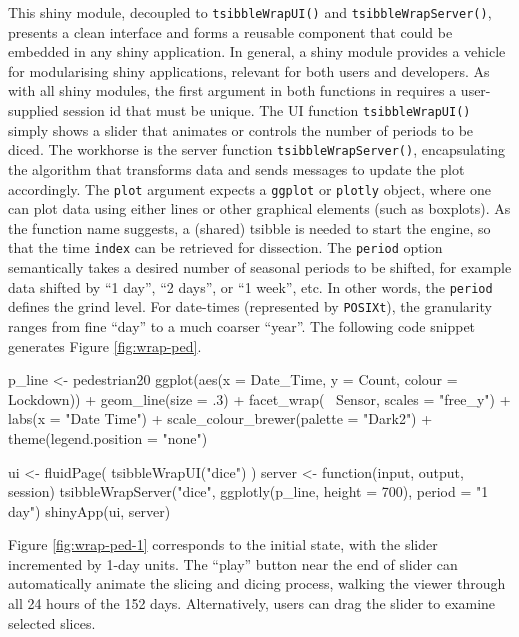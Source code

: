 This shiny module, decoupled to \texttt{tsibbleWrapUI()} and
\texttt{tsibbleWrapServer()}, presents a clean interface and forms a
reusable component that could be embedded in any shiny application. In
general, a shiny module provides a vehicle for modularising shiny
applications, relevant for both users and developers. As with all shiny
modules, the first argument in both functions in 
requires a user-supplied session id that must be unique. The UI function
\texttt{tsibbleWrapUI()} simply shows a slider that animates or controls
the number of periods to be diced. The workhorse is the server function
\texttt{tsibbleWrapServer()}, encapsulating the algorithm that
transforms data and sends messages to update the plot accordingly. The
\texttt{plot} argument expects a \texttt{ggplot} or \texttt{plotly}
object, where one can plot data using either lines or other graphical
elements (such as boxplots). As the function name suggests, a (shared)
tsibble is needed to start the engine, so that the time \texttt{index}
can be retrieved for dissection. The \texttt{period} option semantically
takes a desired number of seasonal periods to be shifted, for example
data shifted by ``1 day'', ``2 days'', or ``1 week'', etc. In other
words, the \texttt{period} defines the grind level. For date-times
(represented by \texttt{POSIXt}), the granularity ranges from fine
``day'' to a much coarser ``year''. The following code snippet generates
Figure \ref{fig:wrap-ped}.

\begin{Schunk}
\begin{Sinput}
p_line <- pedestrian20 %
  ggplot(aes(x = Date_Time, y = Count, colour = Lockdown)) +
  geom_line(size = .3) +
  facet_wrap(~ Sensor, scales = "free_y") +
  labs(x = "Date Time") +
  scale_colour_brewer(palette = "Dark2") +
  theme(legend.position = "none")

ui <- fluidPage(
  tsibbleWrapUI("dice")
)
server <- function(input, output, session) {
  tsibbleWrapServer("dice", ggplotly(p_line, height = 700), period = "1 day")
}
shinyApp(ui, server)
\end{Sinput}
\end{Schunk}

Figure \ref{fig:wrap-ped-1} corresponds to the initial state, with the
slider incremented by 1-day units. The ``play'' button near the end of
slider can automatically animate the slicing and dicing process, walking
the viewer through all 24 hours of the 152 days. Alternatively, users
can drag the slider to examine selected slices.

